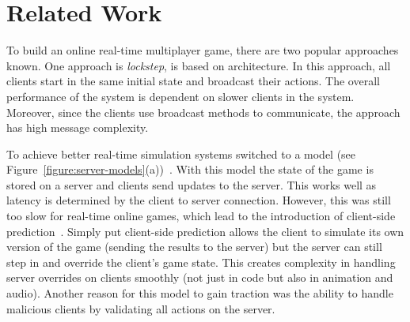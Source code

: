 
\section{Related Work}

To build an online real-time multiplayer game, there are two popular approaches known. One approach is \ptoP \emph{lockstep}, is based on \ptoP architecture. In this approach, all clients start in the same initial state and broadcast their actions. The overall performance of the system is dependent on slower clients in the system. Moreover, since the clients use broadcast methods to communicate, the approach has high message complexity.

To achieve better real-time simulation systems switched to a \clientServer model (see Figure~\ref{figure:server-models}(a))~\cite{DOOMfaq}. With this model the state of the game is stored on a server and clients send updates to the server. This works well as latency is determined by the client to server connection. However, this was still too slow for real-time online games, which lead to the introduction of client-side prediction~\cite{bernier2001latency}. Simply put client-side prediction allows the client to simulate its own version of the game (sending the results to the server) but the server can still step in and override the client's game state. This creates complexity in handling server overrides on clients smoothly (not just in code but also in animation and audio). Another reason for this model to gain traction was the ability to handle malicious clients by validating all actions on the server.

